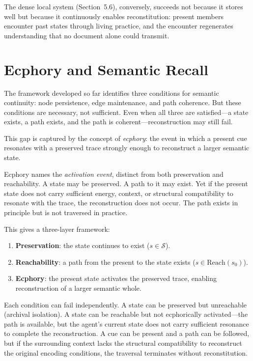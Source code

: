 \documentclass[12pt]{article}
\newcommand{\sS}{\mathcal{S}}
\newcommand{\reach}{\mathrm{Reach}}
\begin{document}
The dense local system (Section~5.6), conversely, succeeds not because
it stores well but because it continuously enables reconstitution: present
members encounter past states through living practice, and the encounter
regenerates understanding that no document alone could transmit.

\section{Ecphory and Semantic Recall}

The framework developed so far identifies three conditions for semantic
continuity: node persistence, edge maintenance, and path coherence.
But these conditions are necessary, not sufficient.
Even when all three are satisfied---a state exists, a path exists, and the
path is coherent---reconstruction may still fail.

This gap is captured by the concept of \emph{ecphory}: the event in which
a present cue resonates with a preserved trace strongly enough to
reconstruct a larger semantic state.

Ecphory names the \emph{activation event}, distinct from both preservation
and reachability.
A state may be preserved.
A path to it may exist.
Yet if the present state does not carry sufficient energy, context, or
structural compatibility to resonate with the trace, the reconstruction
does not occur.
The path exists in principle but is not traversed in practice.

This gives a three-layer framework:

\begin{enumerate}[leftmargin=2em,itemsep=0.2em]
  \item \textbf{Preservation}: the state continues to exist ($s \in \sS$).
  \item \textbf{Reachability}: a path from the present to the state exists
        ($s \in \reach(s_0)$).
  \item \textbf{Ecphory}: the present state activates the preserved trace,
        enabling reconstruction of a larger semantic whole.
\end{enumerate}

Each condition can fail independently.
A state can be preserved but unreachable (archival isolation).
A state can be reachable but not ecphorically activated---the path is
available, but the agent's current state does not carry sufficient
resonance to complete the reconstruction.
A cue can be present and a path can be followed, but if the surrounding
context lacks the structural compatibility to reconstruct the original
encoding conditions, the traversal terminates without reconstitution.
\end{document}
